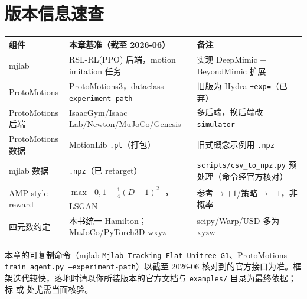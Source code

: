 \section*{版本信息速查}
\label{sec:rlmc-imit-versions}

\begin{center}
\small
\begin{tabular}{@{}lll@{}}
\toprule
组件 & 本章基准（截至 2026-06） & 备注 \\
\midrule
mjlab & RSL-RL(PPO) 后端，motion imitation 任务 & 实现 DeepMimic + BeyondMimic 扩展 \\
ProtoMotions & ProtoMotions3，dataclass \texttt{--experiment-path} & 旧版为 Hydra \texttt{+exp=}（已弃） \\
ProtoMotions 后端 & IsaacGym/Isaac Lab/Newton/MuJoCo/Genesis & 多后端，换后端改 \texttt{--simulator} \\
ProtoMotions 数据 & MotionLib \texttt{.pt}（打包） & 旧式概念示例用 \texttt{.npz} \\
mjlab 数据 & \texttt{.npz}（已 retarget） & \texttt{scripts/csv\_to\_npz.py} 预处理（命令经官方核对） \\
AMP style reward & $\max[0,1-\tfrac14(D-1)^2]$，LSGAN & 参考$\to+1$/策略$\to-1$，非概率 \\
四元数约定 & 本书统一 Hamilton；MuJoCo/PyTorch3D wxyz & scipy/Warp/USD 多为 xyzw \\
\bottomrule
\end{tabular}
\end{center}

\begin{finenote}
本章的可复制命令（mjlab \texttt{Mjlab-Tracking-Flat-Unitree-G1}、ProtoMotions \texttt{train\_agent.py --experiment-path}）以截至 2026-06 核对到的官方接口为准。框架迭代较快，落地时请以你所装版本的官方文档与 \texttt{examples/} 目录为最终依据；标 \rebuilt{} 或  处尤需当面核验。
\end{finenote}
